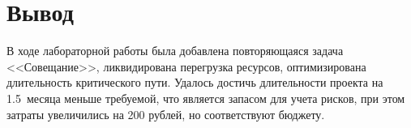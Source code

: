 \section{Вывод}

В ходе лабораторной работы была добавлена повторяющаяся задача <<Совещание>>,
ликвидирована перегрузка ресурсов, оптимизирована длительность критического
пути. Удалось достичь длительности проекта на 1.5~месяца меньше требуемой, что
является запасом для учета рисков, при этом затраты увеличились на 200 рублей,
но соответствуют бюджету.
